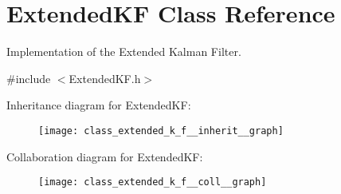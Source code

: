\hypertarget{class_extended_k_f}{\section{\-Extended\-K\-F \-Class \-Reference}
\label{class_extended_k_f}
}


\-Implementation of the \-Extended \-Kalman \-Filter.  




{\ttfamily \#include $<$\-Extended\-K\-F.\-h$>$}



\-Inheritance diagram for \-Extended\-K\-F\-:
\nopagebreak
\begin{figure}[H]
\begin{center}
\leavevmode
\texttt{[image: class\_extended\_k\_f\_\_inherit\_\_graph]}
\end{center}
\end{figure}


\-Collaboration diagram for \-Extended\-K\-F\-:
\nopagebreak
\begin{figure}[H]
\begin{center}
\leavevmode
\texttt{[image: class\_extended\_k\_f\_\_coll\_\_graph]}
\end{center}
\end{figure}

